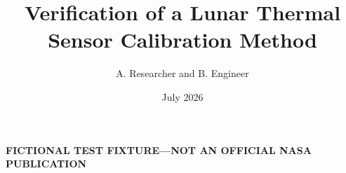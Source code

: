 \documentclass[11pt]{report}
\title{Verification of a Lunar Thermal Sensor Calibration Method}
\author{A. Researcher and B. Engineer}
\date{July 2026}
\begin{document}
\maketitle

\begin{center}
  \textbf{FICTIONAL TEST FIXTURE---NOT AN OFFICIAL NASA PUBLICATION}
\end{center}


\tableofcontents


\clearpage
{}





\appendix



\clearpage

\end{document}
